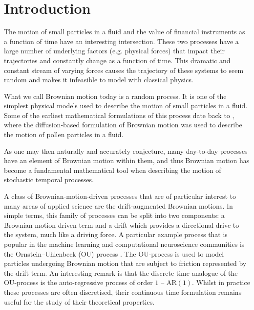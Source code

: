\documentclass[a4paper,12pt,twoside,openright]{report}
\theoremstyle{definition}
\begin{document}
\pagestyle{empty}
\singlespacing

\onehalfspacing

\singlespacing


\setcounter{page}{0}
\pagestyle{plain}
\tableofcontents
\listoffigures
\listoftables

\onehalfspacing


 \chapter{Introduction}
 
 The motion of small particles in a fluid and the value of financial instruments as a function of time have an interesting intersection. These two processes have a large number of underlying factors (e.g. physical forces) that impact their trajectories and constantly change as a function of time. This dramatic and constant stream of varying forces causes the trajectory of these systems to seem random and makes it infeasible to model with classical physics. 
 
 What we call Brownian motion today is a random process. It is one of the simplest physical models used to describe the motion of small particles in a fluid. Some of the earliest mathematical formulations of this process date back to \cite{einstein1905motion}, where the diffusion-based formulation of Brownian motion was used to describe the motion of pollen particles in a fluid.
 
 As one may then naturally and accurately conjecture, many day-to-day processes have an element of Brownian motion within them, and thus Brownian motion has become a fundamental mathematical tool when describing the motion of stochastic temporal processes.
 
 A class of Brownian-motion-driven processes that are of particular interest to many areas of applied science are the drift-augmented Brownian motions. In simple terms, this family of processes can be split into two components: a Brownian-motion-driven term and a drift which provides a directional drive to the system, much like a driving force. A particular example process that is popular in the machine learning and computational neuroscience communities is the Ornstein–Uhlenbeck (OU) process \citep{doob1942brownian}. The OU-process is used to model particles undergoing Brownian motion that are subject to friction represented by the drift term. An interesting remark is that the discrete-time analogue of the OU-process is the auto-regressive process of order $1$ -- $\text{AR}(1)$. Whilst in practice these processes are often discretised, their continuous time formulation remains useful for the study of their theoretical properties.
 
\end{document}
